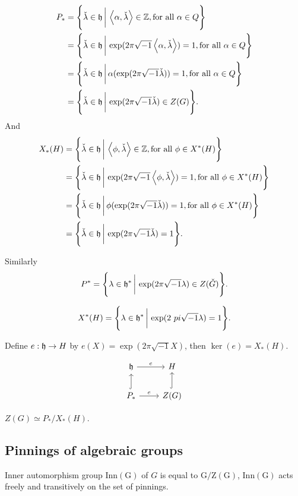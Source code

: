 \documentclass[12pt]{amsart}
\numberwithin{equation}{section}
\newcommand{\bil}[2]{\left\langle#1,#2\right\rangle}
\newcommand{\bigset}[2]{\Biggl\{#1\,\bigg\lvert\,#2\Biggr\}}
\begin{document}
\begin{align*}
  P_* &= \bigset{\check{\lambda} \in \fh}{\bil{\alpha}{\check{\lambda}} \in \BZ, \textrm{for all $\alpha \in Q$}}\\
  & = \bigset{\check{\lambda} \in \fh}{\exp(2\pi\sqrt{-1}\bil{\alpha}{\check{\lambda}}) = 1, \textrm{for all $\alpha \in Q$}}\\
  & = \bigset{\check{\lambda} \in \fh}{\alpha(\exp(2\pi\sqrt{-1}\check{\lambda})) = 1, \textrm{for all $\alpha \in Q$}}\\
  & = \bigset{\check{\lambda} \in \fh}{\exp(2\pi\sqrt{-1}\check{\lambda}) \in Z(G)}.
\end{align*}
And
\begin{align*}
  X_{*}(H) & = \bigset{\check{\lambda} \in \fh}{\bil{\phi}{\check{\lambda}} \in \BZ, \textrm{for all $\phi \in X^*(H)$}}\\
  & = \bigset{\check{\lambda} \in \fh}{\exp(2\pi\sqrt{-1}\bil{\phi}{\check{\lambda}}) = 1, \textrm{for all $\phi \in X^*(H)$}}\\
  & = \bigset{\check{\lambda} \in \fh}{\phi(\exp(2\pi\sqrt{-1}\check{\lambda})) = 1, \textrm{for all $\phi \in X^*(H)$}}\\
  & = \bigset{\check{\lambda} \in \fh}{\exp(2\pi\sqrt{-1}\check{\lambda}) = 1}.
\end{align*} 

Similarly
$$P^* = \bigset{\lambda \in \fh^*}{\exp(2 \pi \sqrt{-1} \lambda) \in Z(\check{G})}. $$

$$X^*(H) = \bigset{\lambda \in \fh^*}{\exp(2 \ pi \sqrt{-1} \lambda ) = 1}.$$


Define $e: \mathfrak{h} \to H$ by $e(X) = \exp(2\pi\sqrt{-1}X)$, then $\ker(e) = X_*(H)$.

\[
\begin{tikzcd}
  \fh \arrow[r,"e"] & H \\
  P_* \arrow[r, "e"] \arrow[u,hook ] & Z(G) \arrow[u,hook]
\end{tikzcd}
\]

$Z(G) \simeq P_*/X_*(H)$.




\subsection{Pinnings of algebraic groups}

\begin{thm}
  Inner automorphism group $\mathrm{Inn(G)}$ of $G$ is equal to $\mathrm{G/Z(G)}$,
  $\mathrm{Inn(G)}$ acts freely and transitively on the set of pinnings.
\end{thm}
\end{document}
